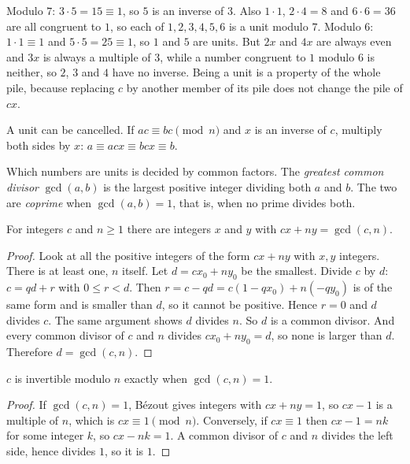 Modulo $7$: $3 \cdot 5 = 15 \equiv 1$, so $5$ is an inverse of $3$. Also $1 \cdot 1$, $2 \cdot 4 = 8$ and $6 \cdot 6 = 36$ are all congruent to $1$, so each of $1, 2, 3, 4, 5, 6$ is a unit modulo $7$. Modulo $6$: $1 \cdot 1 \equiv 1$ and $5 \cdot 5 = 25 \equiv 1$, so $1$ and $5$ are units. But $2x$ and $4x$ are always even and $3x$ is always a multiple of $3$, while a number congruent to $1$ modulo $6$ is neither, so $2$, $3$ and $4$ have no inverse. Being a unit is a property of the whole pile, because replacing $c$ by another member of its pile does not change the pile of $cx$.

A unit can be cancelled. If $ac \equiv bc \pmod n$ and $x$ is an inverse of $c$, multiply both sides by $x$: $a \equiv acx \equiv bcx \equiv b$.

Which numbers are units is decided by common factors. The \emph{greatest common divisor} $\gcd(a, b)$ is the largest positive integer dividing both $a$ and $b$. The two are \emph{coprime} when $\gcd(a, b) = 1$, that is, when no prime divides both.

\begin{lemma}[B\'ezout]
For integers $c$ and $n \ge 1$ there are integers $x$ and $y$ with $cx + ny = \gcd(c, n)$.
\end{lemma}

\begin{proof}
Look at all the positive integers of the form $cx + ny$ with $x, y$ integers. There is at least one, $n$ itself. Let $d = c x_0 + n y_0$ be the smallest. Divide $c$ by $d$: $c = qd + r$ with $0 \le r < d$. Then $r = c - qd = c(1 - q x_0) + n(-q y_0)$ is of the same form and is smaller than $d$, so it cannot be positive. Hence $r = 0$ and $d$ divides $c$. The same argument shows $d$ divides $n$. So $d$ is a common divisor. And every common divisor of $c$ and $n$ divides $c x_0 + n y_0 = d$, so none is larger than $d$. Therefore $d = \gcd(c, n)$.
\end{proof}

\begin{proposition}
$c$ is invertible modulo $n$ exactly when $\gcd(c, n) = 1$.
\end{proposition}

\begin{proof}
If $\gcd(c, n) = 1$, B\'ezout gives integers with $cx + ny = 1$, so $cx - 1$ is a multiple of $n$, which is $cx \equiv 1 \pmod n$. Conversely, if $cx \equiv 1$ then $cx - 1 = nk$ for some integer $k$, so $cx - nk = 1$. A common divisor of $c$ and $n$ divides the left side, hence divides $1$, so it is $1$.
\end{proof}

